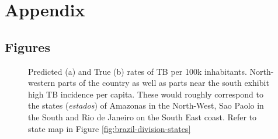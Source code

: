 
\section{Appendix}

\subsection{Figures}

\begin{figure}[H]
	\centering
	\qquad
	\caption{Predicted (a) and True (b) rates of TB per 100k inhabitants. North-western parts of the country as well as parts near the south exhibit high TB incidence per capita. These would roughly correspond to the states (\textit{estados}) of Amazonas in the North-West, Sao Paolo in the South and Rio de Janeiro on the South East coast. Refer to state map in Figure \ref{fig:brazil-division-states}}%
	\label{fig:pred_TB_rate_map}%
\end{figure}

